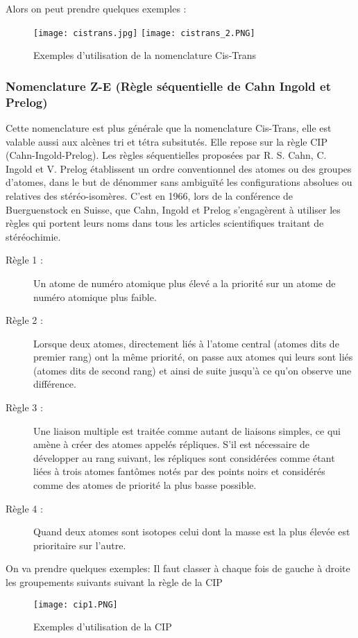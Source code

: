 \documentclass[a4paper, oneside]{book}
\begin{document}
Alors on peut prendre quelques exemples :
\begin{figure}[!h]
    \centering
    \texttt{[image: cistrans.jpg]}
    \texttt{[image: cistrans\_2.PNG]}
    \caption{Exemples d'utilisation de la nomenclature Cis-Trans}
    \label{fig:my_label}
\end{figure}
\newpage
\subsubsection{Nomenclature Z-E (Règle séquentielle de Cahn Ingold et Prelog)}
Cette nomenclature est plus générale que la nomenclature Cis-Trans, elle est valable aussi aux alcènes tri et tétra subsitutés. Elle repose sur la règle CIP (Cahn-Ingold-Prelog). Les règles séquentielles proposées par R. S. Cahn, C. Ingold et V. Prelog établissent un ordre conventionnel des atomes ou des groupes d'atomes, dans le but de dénommer sans ambiguïté les configurations absolues ou relatives des stéréo-isomères. C'est en 1966, lors de la conférence de Buerguenstock en Suisse, que Cahn, Ingold et Prelog s'engagèrent à utiliser les règles qui portent leurs noms dans tous les articles scientifiques traitant de stéréochimie.
\begin{description}
    \item[Règle 1 :] Un atome de numéro atomique plus élevé a la priorité sur un atome de numéro atomique plus faible.
    \item[Règle 2 :] Lorsque deux atomes, directement liés à l'atome central (atomes dits de premier rang) ont la même priorité, on passe aux atomes qui leurs sont liés (atomes dits de second rang) et ainsi de suite jusqu'à ce qu'on observe une différence.
    \item[Règle 3 :] Une liaison multiple est traitée comme autant de liaisons simples, ce qui amène à créer des atomes appelés répliques. S’il est nécessaire de développer au rang suivant, les répliques sont considérées comme étant liées à trois atomes fantômes notés par des points noirs et considérés comme des atomes de priorité la plus basse possible. 
    \item[Règle 4 :] Quand deux atomes sont isotopes celui dont la masse est la plus élevée est prioritaire sur l'autre.
\end{description}
On va prendre quelques exemples: Il faut classer à chaque fois de gauche à droite les groupements suivants suivant la règle de la CIP
\begin{figure}[!h]
    \centering
    \texttt{[image: cip1.PNG]}
    \caption{Exemples d'utilisation de la CIP}
    \label{fig:my_label}
\end{figure}
\end{document}

